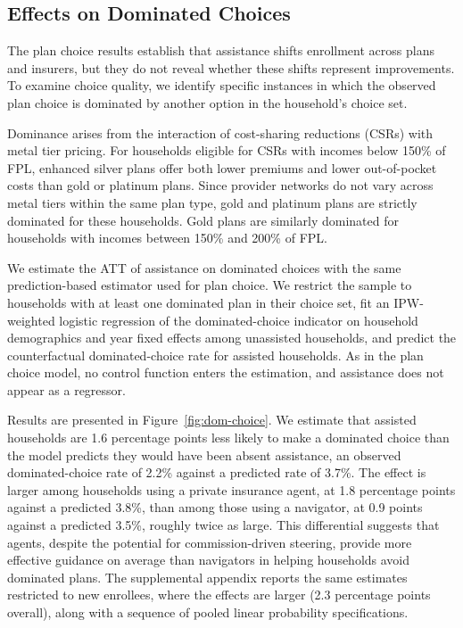 \documentclass[12pt]{article}
\begin{document}
\subsection{Effects on Dominated Choices}
\label{sec:dominated}

The plan choice results establish that assistance shifts enrollment across plans and insurers, but they do not reveal whether these shifts represent improvements. To examine choice quality, we identify specific instances in which the observed plan choice is dominated by another option in the household's choice set.

Dominance arises from the interaction of cost-sharing reductions (CSRs) with metal tier pricing. For households eligible for CSRs with incomes below 150\% of FPL, enhanced silver plans offer both lower premiums and lower out-of-pocket costs than gold or platinum plans. Since provider networks do not vary across metal tiers within the same plan type, gold and platinum plans are strictly dominated for these households. Gold plans are similarly dominated for households with incomes between 150\% and 200\% of FPL.

We estimate the ATT of assistance on dominated choices with the same prediction-based estimator used for plan choice. We restrict the sample to households with at least one dominated plan in their choice set, fit an IPW-weighted logistic regression of the dominated-choice indicator on household demographics and year fixed effects among unassisted households, and predict the counterfactual dominated-choice rate for assisted households. As in the plan choice model, no control function enters the estimation, and assistance does not appear as a regressor.

Results are presented in Figure~\ref{fig:dom-choice}. We estimate that assisted households are 1.6 percentage points less likely to make a dominated choice than the model predicts they would have been absent assistance, an observed dominated-choice rate of 2.2\% against a predicted rate of 3.7\%. The effect is larger among households using a private insurance agent, at 1.8 percentage points against a predicted 3.8\%, than among those using a navigator, at 0.9 points against a predicted 3.5\%, roughly twice as large. This differential suggests that agents, despite the potential for commission-driven steering, provide more effective guidance on average than navigators in helping households avoid dominated plans. The supplemental appendix reports the same estimates restricted to new enrollees, where the effects are larger (2.3 percentage points overall), along with a sequence of pooled linear probability specifications.
\end{document}
